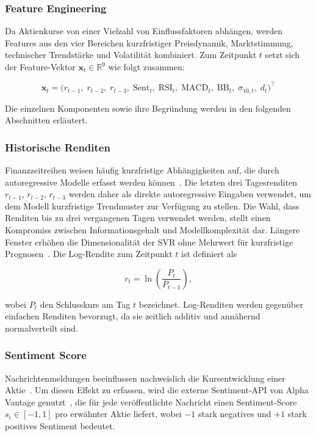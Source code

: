 \subsubsection{Feature Engineering}

Da Aktienkurse von einer Vielzahl von Einflussfaktoren abhängen, werden Features aus den vier Bereichen kurzfristiger Preisdynamik, Marktstimmung, technischer Trendstärke und Volatilität kombiniert. Zum Zeitpunkt $t$ setzt sich der Feature-Vektor $\mathbf{x}_t \in \mathbb{R}^9$ wie folgt zusammen:

\begin{equation}
    \mathbf{x}_t = \bigl(r_{t-1},\; r_{t-2},\; r_{t-3},\; \text{Sent}_t,\; \text{RSI}_t,\; \text{MACD}_t,\; \text{BB}_t,\; \sigma_{10,t},\; d_t \bigr)^\top
\end{equation}

Die einzelnen Komponenten sowie ihre Begründung werden in den folgenden Abschnitten erläutert.

\subsubsection{Historische Renditen}

Finanzzeitreihen weisen häufig kurzfristige Abhängigkeiten auf, die durch autoregressive Modelle erfasst werden können~\cite{campbell1997}. Die letzten drei Tagesrenditen $r_{t-1}$, $r_{t-2}$, $r_{t-3}$ werden daher als direkte autoregressive Eingaben verwendet, um dem Modell kurzfristige Trendmuster zur Verfügung zu stellen. Die Wahl, dass Renditen bis zu drei vergangenen Tagen verwendet werden, stellt einen Kompromiss zwischen Informationsgehalt und Modellkomplexität dar. Längere Fenster erhöhen die Dimensionalität der \ac{SVR} ohne Mehrwert für kurzfristige Prognosen~\cite{fama1970}. Die Log-Rendite zum Zeitpunkt $t$ ist definiert als

\begin{equation}
    r_t = \ln\!\left(\frac{P_t}{P_{t-1}}\right),
\end{equation}

wobei $P_t$ den Schlusskurs am Tag $t$ bezeichnet. Log-Renditen werden gegenüber einfachen Renditen bevorzugt, da sie zeitlich additiv und annähernd normalverteilt sind.

\subsubsection{Sentiment Score}

Nachrichtenmeldungen beeinflussen nachweislich die Kursentwicklung einer Aktie~\cite{tetlock2007}. Um diesen Effekt zu erfassen, wird die externe Sentiment-API von Alpha Vantage genutzt~\cite{alphavantage}, die für jede veröffentlichte Nachricht einen Sentiment-Score $s_{i} \in [-1, 1]$ pro erwähnter Aktie liefert, wobei $-1$ stark negatives und $+1$ stark positives Sentiment bedeutet.

